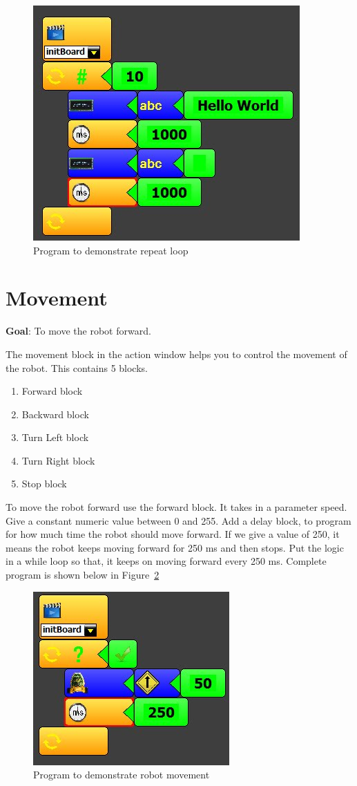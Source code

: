 \begin{figure}[h]
\centering
\includegraphics[width=0.5\columnwidth]{Images/Manual/lesson_6}
\caption{Program to demonstrate repeat loop}
\label{fig:lesson_6}
\end{figure}

\section{Movement}

\textbf{Goal}: To move the robot forward.

The movement block in the action window helps you to control the movement of the robot. This contains 5 blocks.
\begin{enumerate}
	\item Forward block
	\item Backward block
	\item Turn Left block
	\item Turn Right block
	\item Stop block
\end{enumerate}
To move the robot forward use the forward block. It takes in a parameter speed. Give a constant numeric value between 0 and 255. Add a delay block, to program for how much time the robot should move forward. If we give a value of 250, it means the robot keeps moving forward for 250 ms and then stops. Put the logic in a while loop so that, it keeps on moving forward every 250 ms. Complete program is shown below in Figure~\ref{fig:lesson_7}

\begin{figure}[h]
\centering
\includegraphics[width=0.25\columnwidth]{Images/Manual/lesson_7}
\caption{Program to demonstrate robot movement}
\label{fig:lesson_7}
\end{figure}

